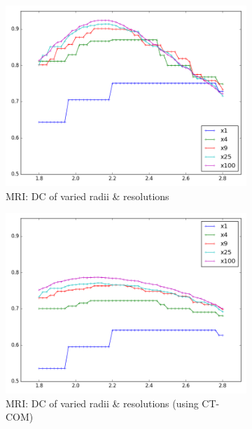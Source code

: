 \documentclass[parskip,bibtotoc,final,twoside=false,titlepage,a4paper,english,12pt,titlepage,a4paper]{scrbook}
\begin{document}
\begin{figure}[!tbp]
  \begin{subfigure}[b]{\textwidth}
    \centering
    \includegraphics[scale=0.65]{python/dice/MR-51iter.png}
    \caption{MRI: DC of varied radii \& resolutions}
    \label{fig:MR_dc-opti}
  \end{subfigure}
  \begin{subfigure}[b]{\textwidth}
    \centering
    \includegraphics[scale=0.65]{python/dice/MR_CT-COM_51iter.png}
    \caption{MRI: DC of varied radii \& resolutions (using CT-COM)}
    \label{fig:MR_CT-COM_dc-opti}
  \end{subfigure}
  \caption{}
  \label{fig:MR_dc}
\end{figure}
\end{document}
